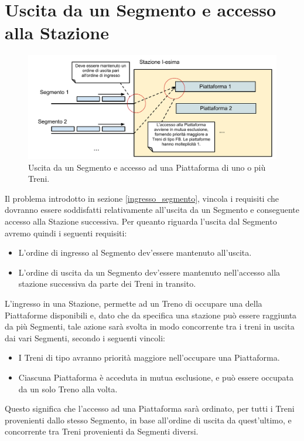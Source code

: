 \section{Uscita da un Segmento e accesso alla Stazione}

\begin{figure}[htbp]
	\includegraphics[width=\textwidth,keepaspectratio]{imgs/Ingresso_Stazione.pdf}
	\caption{\footnotesize{Uscita da un Segmento e accesso ad una Piattaforma di uno o più Treni.}}
\end{figure}

Il problema introdotto in sezione \ref{ingresso_segmento}, vincola i requisiti che dovranno essere soddisfatti relativamente all'uscita da un Segmento e conseguente accesso alla Stazione successiva. Per queanto riguarda l'uscita dal Segmento avremo quindi i seguenti requisiti:
	\begin{itemize}
		\item L'ordine di ingresso al Segmento dev'essere mantenuto all'uscita. 
		\item L'ordine di uscita da un Segmento dev'essere mantenuto nell'accesso alla stazione successiva da parte dei Treni in transito.
	\end{itemize}

L'ingresso in una Stazione, permette ad un Treno di occupare una della Piattaforme disponibili e, dato che da specifica una stazione può essere raggiunta da più Segmenti, tale azione sarà svolta in modo concorrente tra i treni in uscita dai vari Segmenti, secondo i seguenti vincoli:
	\begin{itemize}
		\item I Treni di tipo  avranno priorità maggiore nell'occupare una Piattaforma.
		\item Ciascuna Piattaforma è acceduta in mutua esclusione, e può essere occupata da un solo Treno alla volta.  
	\end{itemize}

Questo significa che l'accesso ad una Piattaforma sarà ordinato, per tutti i Treni provenienti dallo stesso Segmento, in base all'ordine di uscita da quest'ultimo, e concorrente tra Treni provenienti da Segmenti diversi. 

